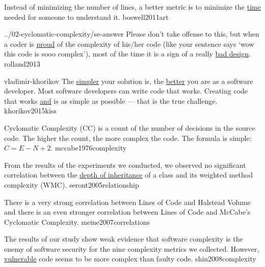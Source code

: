 \documentclass{article}
\begin{document}

  {Instead of minimizing the number of lines, a better metric is to minimize the \ul{time} needed for someone to understand it.}
  {boswell2011art}


\lnQuote
  {../02-cyclomatic-complexity/se-answer}
  {Please don't take offense to this, but when a coder is \ul{proud} of the complexity of his/her code (like your sentence says `wow this code is sooo complex'), most of the time it is a sign of a really \ul{bad design}.}
  {rolland2013}

\lnQuote
  {vladimir-khorikov}
  {The \ul{simpler} your solution is, the \ul{better} you are as a software developer. Most software developers can write code that works. Creating code that works \ul{and} is as simple as possible --- that is the true challenge.}
  {khorikov2015kiss}


  {Cyclomatic Complexity (CC) is a count of the number of decisions in the source code. The higher the count, the more complex the code. The formula is simple: \(C=E-N+2\).}
  {mccabe1976complexity}



  {From the results of the experiments we conducted, we observed no significant correlation between the \ul{depth of inheritance} of a class and its weighted method complexity (WMC).}
  {seront2005relationship}

  {There is a very strong correlation between Lines of Code and Halstead Volume and there is an even stronger correlation between Lines of Code and McCabe's Cyclomatic Complexity.}
  {meine2007correlations}

  {The results of our study show weak evidence that software complexity is the enemy of software security for the nine complexity metrics we collected. However, \ul{vulnerable} code seems to be more complex than faulty code.}
  {shin2008complexity}
\end{document}
